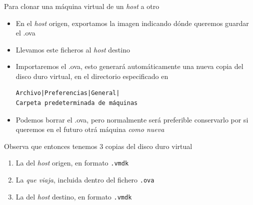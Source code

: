 \documentclass[ucs]{beamer}
\begin{document}
\begin{frame}[fragile]
\frametitle{}
Para clonar una máquina virtual de un
\emph{host}
a otro
\begin{itemize}
\item
En el 
\emph{host}
origen, exportamos la imagen
indicando dónde queremos guardar el .ova 


\item
Llevamos este ficheros al 
\emph{host} 
destino 

\item
Importaremos el .ova, esto generará automáticamente una nueva copia 
del disco duro virtual, en el directorio especificado en

\begin{scriptsize}
\begin{verbatim}
Archivo|Preferencias|General|
Carpeta predeterminada de máquinas
\end{verbatim}
\end{scriptsize}
\item
Podemos borrar el .ova, pero normalmente será preferible
conservarlo por si queremos en el futuro otrá máquina \emph{como nueva}


\end{itemize}

Observa que entonces tenemos 3 copias del disco duro virtual
\begin{enumerate}
\item
La del 
\emph{host}
origen, en formato \verb|.vmdk|
\item
La \emph{que viaja}, incluida dentro del fichero \verb|.ova|
\item
La del
\emph{host}
destino, en formato \verb|.vmdk|
\end{enumerate}


\end{frame}



%
%
%
\end{document}
